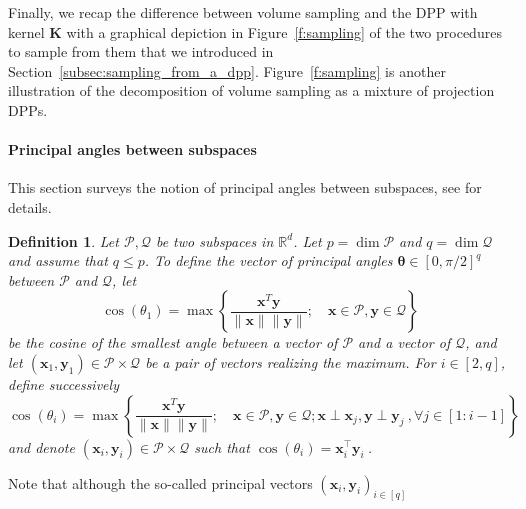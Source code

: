 \documentclass[twoside,11pt]{book}
\newtheorem{definition}{Definition}
\numberwithin{theorem}{chapter}
\numberwithin{definition}{chapter}
\numberwithin{proposition}{chapter}
\numberwithin{corollary}{chapter}
\numberwithin{example}{chapter}
\numberwithin{lemma}{chapter}
\DeclareMathOperator{\Tran}{\intercal}
\begin{document}
Finally, we recap the difference between volume sampling and the DPP with kernel $\bm K$ with a graphical depiction in Figure~\ref{f:sampling} of the two procedures to sample from them that we introduced in Section~\ref{subsec:sampling_from_a_dpp}. Figure~\ref{f:sampling} is another illustration of the decomposition of volume sampling as a mixture of projection DPPs.
\paragraph{Principal angles between subspaces}
This section surveys the notion of principal angles between subspaces, see \cite[Section 6.4.3]{GoVa96} for details.
\begin{definition}
  \label{d:angles}
Let $\mathcal{P},\mathcal{Q}$ be two subspaces in $\mathbb{R}^{d}$. Let $p= \dim\mathcal{P}$ and $q = \dim\mathcal{Q}$ and assume that $q \leq p$. To define the vector of principal angles $\bm{\theta} \in [0,\pi/2]^{q}$ between $\mathcal{P}$ and $\mathcal{Q}$, let
\begin{equation}\label{eq:max_def_principal_angle_1}
 \cos(\theta_{1}) = \max \left\{ \frac{\bm{x}^{T}\bm{y}}{\|\bm{x}\|\|\bm{y}\|}; \quad \bm{x} \in \mathcal{P}, \bm{y} \in \mathcal{Q} \right\}
\end{equation}
be the cosine of the smallest angle between a vector of $\mathcal{P}$ and a vector of $\mathcal{Q}$, and let $(\bm{x}_{1},\bm{y}_{1}) \in \mathcal{P}\times \mathcal{Q}$ be a pair of vectors realizing the maximum. For $i \in [2,q]$, define successively
\begin{equation}\label{eq:max_def_principal_angles}
 \cos(\theta_{i}) = \max \left\{\frac{\bm{x}^{T}\bm{y}}{\|\bm{x}\|\|\bm{y}\|}; \quad \bm{x} \in \mathcal{P}, \bm{y} \in \mathcal{Q}; \bm{x} \perp \bm{x}_{j}, \bm{y} \perp \bm{y}_{j}\:, \forall j \in [1:i-1] \right\}
\end{equation}
and denote $(\bm{x}_{i},\bm{y}_{i}) \in \mathcal{P}\times\mathcal{Q}$ such that $\cos(\theta_{i}) = \bm{x}_{i}^{\Tran}\bm{y}_{i} \:$.
\end{definition}
Note that although the so-called principal vectors $(\bm{x}_{i},\bm{y}_{i})_{i \in [q]}$
\end{document}
